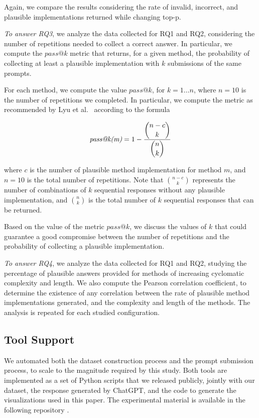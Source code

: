 Again, we compare the results considering the rate of invalid, incorrect, and plausible implementations returned while changing top-p.  

\emph{To answer RQ3}, we analyze the data collected for RQ1 and RQ2, considering the number of repetitions needed to collect a correct answer. In particular, we compute the $pass@k$ metric that returns, for a given method, the probability of collecting at least a plausible implementation with $k$ submissions of the same prompts. 

For each method, we compute the value $pass@k$, for $k=1\ldots n$, where $n=10$ is the number of repetitions we completed. In particular, we  compute the metric as recommended by Lyu et al.~\cite{lyu2024top} according to the formula 


\[
\text{\textit{pass@k(m)}} = 1 - \dfrac{\dbinom{n - c}{k}}{\dbinom{n}{k}}
\]

\noindent
where $c$ is the number of plausible method implementation for method $m$, and $n=10$ is the total number of repetitions. Note that \(\binom{n - c}{k}\) represents the number of combinations of $k$ sequential responses without any plausible implementation, and \(\binom{n}{k}\) is the total number of $k$ sequential responses that can be returned. 

Based on the value of the metric $pass@k$, we discuss the values of $k$ that could guarantee a good compromise between the number of repetitions and the probability of collecting a plausible implementation.

\emph{To answer RQ4}, we analyze the data collected for RQ1 and RQ2, studying the percentage of plausible answers provided for methods of increasing cyclomatic complexity and length. We also compute the Pearson correlation coefficient, to determine the existence of any correlation between the rate of plausible method implementations generated, and the complexity and length of the methods. The analysis is repeated for each studied configuration.


\subsection{Tool Support}
We automated both the dataset construction process and the prompt submission process, to scale to the magnitude required by this study. Both tools are implemented as a set of Python scripts that we released publicly, jointly with our dataset, the response generated by ChatGPT, and the code to generate the visualizations used in this paper. The experimental material is available in the following repository \urlRepo.
